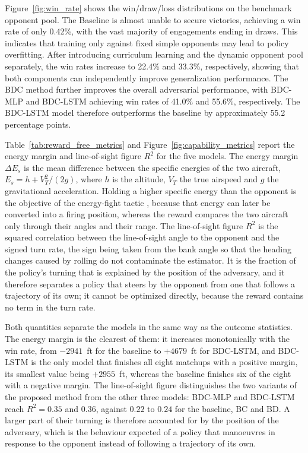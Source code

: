 \documentclass[pdflatex,sn-mathphys-num]{sn-jnl}%
\theoremstyle{thmstyleone}%
\theoremstyle{thmstyletwo}%
\theoremstyle{thmstylethree}%
\begin{document}
Figure~\ref{fig:win_rate} shows the win/draw/loss distributions on the benchmark opponent pool. The Baseline is almost unable to secure victories, achieving a win rate of only 0.42\%, with the vast majority of engagements ending in draws. This indicates that training only against fixed simple opponents may lead to policy overfitting. After introducing curriculum learning and the dynamic opponent pool separately, the win rates increase to 22.4\% and 33.3\%, respectively, showing that both components can independently improve generalization performance. The BDC method further improves the overall adversarial performance, with BDC-MLP and BDC-LSTM achieving win rates of 41.0\% and 55.6\%, respectively. The BDC-LSTM model therefore outperforms the baseline by approximately 55.2 percentage points.

Table~\ref{tab:reward_free_metrics} and Figure~\ref{fig:capability_metrics} report the energy margin and line-of-sight figure $R^{2}$ for the five models. The energy margin $\Delta E_s$ is the mean difference between the specific energies of the two aircraft, $E_s=h+V_T^{2}/(2g)$, where $h$ is the altitude, $V_T$ the true airspeed and $g$ the gravitational acceleration. Holding a higher specific energy than the opponent is the objective of the energy-fight tactic \cite{energy1,energy2}, because that energy can later be converted into a firing position, whereas the reward compares the two aircraft only through their angles and their range. The line-of-sight figure $R^{2}$ is the squared correlation between the line-of-sight angle to the opponent and the signed turn rate, the sign being taken from the bank angle so that the heading changes caused by rolling do not contaminate the estimator. It is the fraction of the policy's turning that is explained by the position of the adversary, and it therefore separates a policy that steers by the opponent from one that follows a trajectory of its own; it cannot be optimized directly, because the reward contains no term in the turn rate.

Both quantities separate the models in the same way as the outcome statistics. The energy margin is the clearest of them: it increases monotonically with the win rate, from $-2941$~ft for the baseline to $+4679$~ft for BDC-LSTM, and BDC-LSTM is the only model that finishes all eight matchups with a positive margin, its smallest value being $+2955$~ft, whereas the baseline finishes six of the eight with a negative margin. The line-of-sight figure distinguishes the two variants of the proposed method from the other three models: BDC-MLP and BDC-LSTM reach $R^{2}=0.35$ and $0.36$, against $0.22$ to $0.24$ for the baseline, BC and BD. A larger part of their turning is therefore accounted for by the position of the adversary, which is the behaviour expected of a policy that manoeuvres in response to the opponent instead of following a trajectory of its own.
\end{document}
